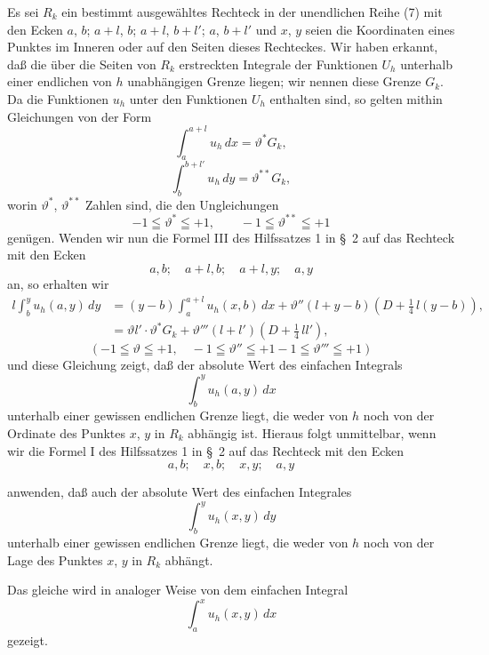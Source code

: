\documentclass{article}
\begin{document}
Es sei $R_k$ ein bestimmt ausgewähltes Rechteck in der unendlichen Reihe (7) mit den Ecken $a$, $b$; $a+l$, $b$; $a+l$, $b+l'$; $a$, $b+l'$ und $x$, $y$ seien die Koordinaten eines Punktes im Inneren oder auf den Seiten dieses Rechteckes. Wir haben erkannt, daß die über die Seiten von $R_k$ erstreckten Integrale der Funktionen $U_h$ unterhalb einer endlichen von $h$ unabhängigen Grenze liegen; wir nennen diese Grenze $G_k$. Da die Funktionen $u_h$ unter den Funktionen $U_h$ enthalten sind, so gelten mithin Gleichungen von der Form
\[
\int_a^{a+l} u_h\,dx = \vartheta^* G_k,
\]
\[
\int_b^{b+l'} u_h\,dy = \vartheta^{**} G_k,
\]
worin $\vartheta^*$, $\vartheta^{**}$ Zahlen sind, die den Ungleichungen
\[
-1 \leqq \vartheta^* \leqq +1, \qquad -1 \leqq \vartheta^{**} \leqq +1
\]
genügen. Wenden wir nun die Formel III des Hilfssatzes 1 in §~2 auf das Rechteck mit den Ecken
\[
a, b; \quad a+l, b; \quad a+l, y; \quad a, y
\]
an, so erhalten wir
\[
\begin{aligned}
l \int_b^y u_h(a, y)\,dy &= (y-b) \int_a^{a+l} u_h(x, b)\,dx + \vartheta''(l+y-b)\left(D + \frac{1}{4}\,l(y-b)\right), \\
&= \vartheta l' \cdot \vartheta^* G_k + \vartheta''' (l+l') \left(D + \frac{1}{4}\,l l'\right),
\end{aligned}
\]
\[
(-1 \leqq \vartheta \leqq +1, \quad -1 \leqq \vartheta'' \leqq +1 - 1 \leqq \vartheta''' \leqq +1)
\]
%
und diese Gleichung zeigt, daß der absolute Wert des einfachen Integrals
\[
\int_b^y u_h(a, y)\,dx
\]
unterhalb einer gewissen endlichen Grenze liegt, die weder von $h$ noch von der Ordinate des Punktes $x$, $y$ in $R_k$ abhängig ist. Hieraus folgt unmittelbar, wenn wir die Formel I des Hilfssatzes 1 in §~2 auf das Rechteck mit den Ecken
\[
a, b; \quad x, b; \quad x, y; \quad a, y
\]

anwenden, daß auch der absolute Wert des einfachen Integrales
\[
\int_b^y u_h(x, y)\,dy
\]
unterhalb einer gewissen endlichen Grenze liegt, die weder von $h$ noch von der Lage des Punktes $x$, $y$ in $R_k$ abhängt.

Das gleiche wird in analoger Weise von dem einfachen Integral
\[
\int_a^x u_h(x, y)\,dx
\]
gezeigt.
\end{document}

